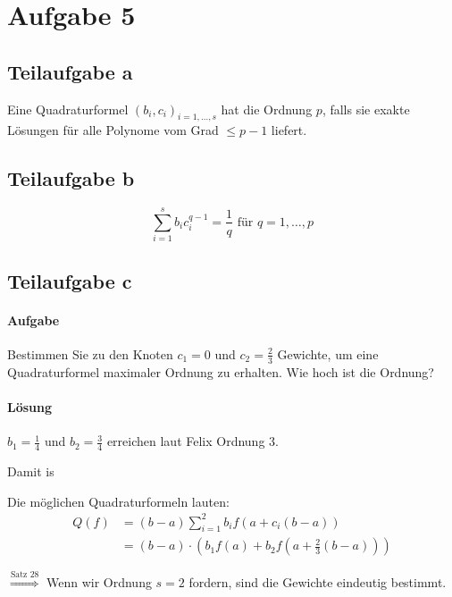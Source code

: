 \section*{Aufgabe 5}
\subsection*{Teilaufgabe a}
Eine Quadraturformel $(b_i, c_i)_{i=1, \dots, s}$ hat die Ordnung
$p$, falls sie exakte Lösungen für alle Polynome vom Grad $\leq p -1$
liefert.

\subsection*{Teilaufgabe b}
\[\sum_{i=1}^s b_i c_i^{q-1} = \frac{1}{q} \text{ für } q = 1, \dots, p\]

\subsection*{Teilaufgabe c}
\paragraph{Aufgabe} Bestimmen Sie zu den Knoten $c_1 = 0$ und $c_2 = \frac{2}{3}$ Gewichte, um eine Quadraturformel
maximaler Ordnung zu erhalten. Wie hoch ist die Ordnung?

\paragraph{Lösung}

$b_1 = \frac{1}{4}$ und $b_2 = \frac{3}{4}$ erreichen laut Felix Ordnung 3.

Damit is

Die möglichen Quadraturformeln lauten:
\begin{align}
	Q(f) &= (b-a)\sum_{i=1}^2 b_i f (a+ c_i (b-a))\\
		 &= (b-a) \cdot \left ( b_1 f(a) + b_2 f \left (a + \frac{2}{3}(b-a) \right ) \right )
\end{align}

$\stackrel{\text{Satz 28}}{\Rightarrow}$ Wenn wir Ordnung $s = 2$ fordern, sind die Gewichte eindeutig bestimmt.
